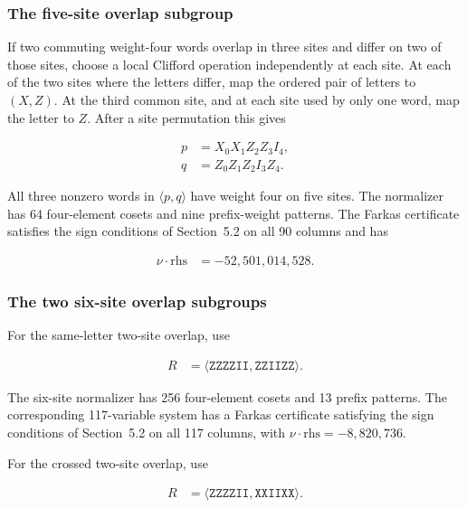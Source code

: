 \documentclass[11pt]{article}
\newcommand{\rhs}{\mathrm{rhs}}
\begin{document}
\subsubsection{The five-site overlap subgroup}\label{the-five-site-overlap-subgroup}

If two commuting weight-four words overlap in three sites and differ on two of those sites, choose a local Clifford operation independently at each site. At each of the two sites where the letters differ, map the ordered pair of letters to \((X,Z)\). At the third common site, and at each site used by only one word, map the letter to \(Z\). After a site permutation this gives

\[
\begin{aligned}
p &=X_{0} X_{1} Z_{2} Z_{3} I_{4}, \\
q &=Z_{0} Z_{1} Z_{2} I_{3} Z_{4}.
\end{aligned}
\]

All three nonzero words in \(\langle p,q \rangle\) have weight four on five sites. The normalizer has 64 four-element cosets and nine prefix-weight patterns. The Farkas certificate satisfies the sign conditions of Section~5.2 on all 90 columns and has

\[
\begin{aligned}
\nu \cdot \rhs &=-52{,}501{,}014{,}528.
\end{aligned}
\]

\subsubsection{The two six-site overlap subgroups}\label{the-two-six-site-overlap-subgroups}

For the same-letter two-site overlap, use

\[
\begin{aligned}
R &=\langle \mathtt{ZZZZII}, \mathtt{ZZIIZZ} \rangle.
\end{aligned}
\]

The six-site normalizer has 256 four-element cosets and 13 prefix patterns. The corresponding 117-variable system has a Farkas certificate satisfying the sign conditions of Section~5.2 on all 117 columns, with \(\nu \cdot \rhs=-8{,}820{,}736\).

For the crossed two-site overlap, use

\[
\begin{aligned}
R &=\langle \mathtt{ZZZZII}, \mathtt{XXIIXX} \rangle.
\end{aligned}
\]
\end{document}
